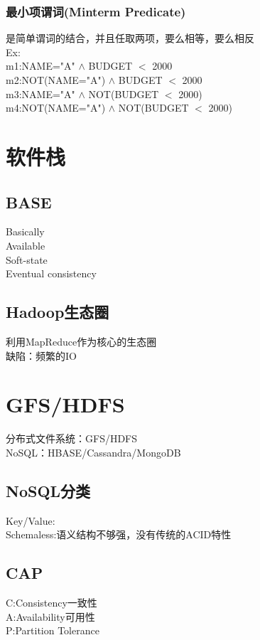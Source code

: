\documentclass{article}
\begin{document}
\begin{CJK}{UTF8}{gbsn}
	\subsubsection*{最小项谓词(Minterm Predicate)}
	是简单谓词的结合，并且任取两项，要么相等，要么相反\\
	Ex:\\
	m1:NAME="A" $\land$ BUDGET $<$ 2000\\
	m2:NOT(NAME="A") $\land$ BUDGET $<$ 2000\\
	m3:NAME="A" $\land$ NOT(BUDGET $<$ 2000)\\
	m4:NOT(NAME="A") $\land$ NOT(BUDGET $<$ 2000)\\
	
	
	\section*{软件栈}
	
	
	\subsection*{BASE}
	Basically\\
	Available\\
	Soft-state\\
	Eventual consistency\\
	
	\subsection*{Hadoop生态圈}
	利用MapReduce作为核心的生态圈\\
	缺陷：频繁的IO\\
	
	
	\section*{GFS/HDFS}
	分布式文件系统：GFS/HDFS\\
	NoSQL：HBASE/Cassandra/MongoDB\\
	\subsection*{NoSQL分类}
	Key/Value:\\
	Schemaless:语义结构不够强，没有传统的ACID特性\\
	
	\subsection*{CAP}
	C:Consistency一致性\\
	A:Availability可用性\\
	P:Partition Tolerance\\

\end{CJK}
\end{document}
